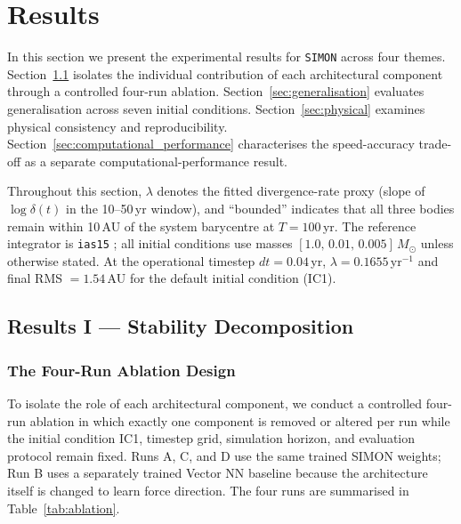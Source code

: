 \documentclass[12pt]{article}
\begin{document}
\section{Results}
\label{sec:results}

In this section we present the experimental results for \texttt{SIMON} across four
themes. Section~\ref{sec:stability} isolates the individual contribution of each
architectural component through a controlled four-run ablation. Section~\ref{sec:generalisation}
evaluates generalisation across seven initial conditions. Section~\ref{sec:physical}
examines physical consistency and reproducibility. Section~\ref{sec:computational_performance}
characterises the speed-accuracy trade-off as a separate computational-performance result.

Throughout this section, $\lambda$ denotes the fitted divergence-rate proxy (slope of
$\log\delta(t)$ in the 10--50\,yr window), and ``bounded'' indicates that all three
bodies remain within 10\,AU of the system barycentre at $T = 100$\,yr. The reference
integrator is \texttt{ias15} \citep{Rein_2014}; all initial conditions use masses
$[1.0,\,0.01,\,0.005]\,M_\odot$ unless otherwise stated. At the operational timestep
$dt = 0.04$\,yr, $\lambda = 0.1655$\,yr$^{-1}$ and final RMS $= 1.54$\,AU for the
default initial condition (IC1).

\subsection{Results I --- Stability Decomposition}
\label{sec:stability}

\subsubsection{The Four-Run Ablation Design}

To isolate the role of each architectural component, we conduct a controlled four-run
ablation in which exactly one component is removed or altered per run while the initial
condition IC1, timestep grid, simulation horizon, and evaluation protocol remain fixed. Runs
A, C, and D use the same trained SIMON weights; Run B uses a separately trained
Vector NN baseline because the architecture itself is changed to learn force direction.
The four runs are summarised in
Table~\ref{tab:ablation}.
\end{document}

